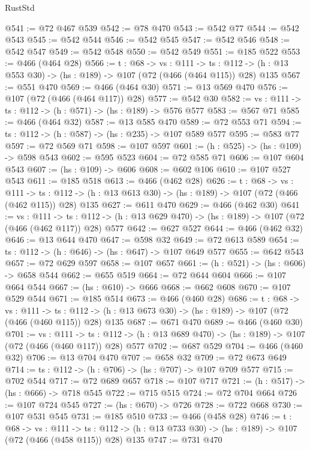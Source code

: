 \begin{lexlean}{RustStd}
\begin{coremodule}
@541 := @72 @467 @539
@542 := @78 @470
@543 := @542 @77
@544 := @542 @543
@545 := @542 @544
@546 := @542 @545
@547 := @542 @546
@548 := @542 @547
@549 := @542 @548
@550 := @542 @549
@551 := @185 @522
@553 := @466 (@464 @28)
@566 := {t : @68} ->
  {vs : @111} ->
  {ts : @112} -> (h : @13 @553 @30) -> (hs : @189) -> @107 (@72 (@466 (@464 @115)) @28) @135
@567 := @551 @470
@569 := @466 (@464 @30)
@571 := @13 @569 @470
@576 := @107 (@72 (@466 (@464 @117)) @28)
@577 := @542 @30
@582 := {vs : @111} -> {ts : @112} -> (h : @571) -> (hs : @189) -> @576 @577
@583 := @567 @71
@585 := @466 (@464 @32)
@587 := @13 @585 @470
@589 := @72 @553 @71
@594 := {ts : @112} -> (h : @587) -> (hs : @235) -> @107 @589 @577
@595 := @583 @77
@597 := @72 @569 @71
@598 := @107 @597
@601 := (h : @525) -> (hs : @109) -> @598 @543
@602 := @595 @523
@604 := @72 @585 @71
@606 := @107 @604 @543
@607 := (hs : @109) -> @606
@608 := @602 @106
@610 := @107 @527 @543
@611 := @185 @518
@613 := @466 (@462 @28)
@626 := {t : @68} ->
  {vs : @111} ->
  {ts : @112} -> (h : @13 @613 @30) -> (hs : @189) -> @107 (@72 (@466 (@462 @115)) @28) @135
@627 := @611 @470
@629 := @466 (@462 @30)
@641 := {vs : @111} ->
  {ts : @112} -> (h : @13 @629 @470) -> (hs : @189) -> @107 (@72 (@466 (@462 @117)) @28) @577
@642 := @627 @527
@644 := @466 (@462 @32)
@646 := @13 @644 @470
@647 := @598 @32
@649 := @72 @613 @589
@654 := {ts : @112} -> (h : @646) -> (hs : @647) -> @107 @649 @577
@655 := @642 @543
@657 := @72 @629 @597
@658 := @107 @657
@661 := (h : @521) -> (hs : @606) -> @658 @544
@662 := @655 @519
@664 := @72 @644 @604
@666 := @107 @664 @544
@667 := (hs : @610) -> @666
@668 := @662 @608
@670 := @107 @529 @544
@671 := @185 @514
@673 := @466 (@460 @28)
@686 := {t : @68} ->
  {vs : @111} ->
  {ts : @112} -> (h : @13 @673 @30) -> (hs : @189) -> @107 (@72 (@466 (@460 @115)) @28) @135
@687 := @671 @470
@689 := @466 (@460 @30)
@701 := {vs : @111} ->
  {ts : @112} -> (h : @13 @689 @470) -> (hs : @189) -> @107 (@72 (@466 (@460 @117)) @28) @577
@702 := @687 @529
@704 := @466 (@460 @32)
@706 := @13 @704 @470
@707 := @658 @32
@709 := @72 @673 @649
@714 := {ts : @112} -> (h : @706) -> (hs : @707) -> @107 @709 @577
@715 := @702 @544
@717 := @72 @689 @657
@718 := @107 @717
@721 := (h : @517) -> (hs : @666) -> @718 @545
@722 := @715 @515
@724 := @72 @704 @664
@726 := @107 @724 @545
@727 := (hs : @670) -> @726
@728 := @722 @668
@730 := @107 @531 @545
@731 := @185 @510
@733 := @466 (@458 @28)
@746 := {t : @68} ->
  {vs : @111} ->
  {ts : @112} -> (h : @13 @733 @30) -> (hs : @189) -> @107 (@72 (@466 (@458 @115)) @28) @135
@747 := @731 @470

\end{coremodule}
\end{lexlean}
